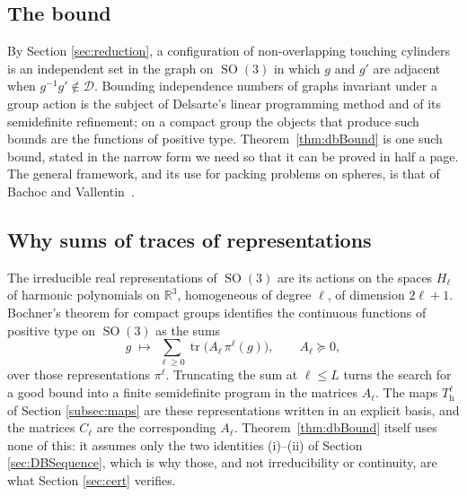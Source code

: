 \documentclass[reqno]{amsart}
\theoremstyle{definition}
\DeclareMathOperator{\SO}{SO}
\DeclareMathOperator{\tr}{tr}
\newcommand{\R}{\mathbb{R}}
\newcommand{\Dom}{\mathcal{D}}
\begin{document}
\subsection{The bound}
By Section \ref{sec:reduction}, a configuration of non-overlapping touching cylinders is an independent
set in the graph on $\SO(3)$ in which $g$ and $g'$ are adjacent when $g^{-1}g'\notin\Dom$. Bounding
independence numbers of graphs invariant under a group action is the subject of Delsarte's linear
programming method and of its semidefinite refinement; on a compact group the objects that produce
such bounds are the functions of positive type. Theorem~\ref{thm:dbBound} is one such bound,
stated in the narrow form we need so that it can be proved in half a page. The general framework,
and its use for packing problems on spheres, is that of Bachoc and
Vallentin~\cite{BV}.

\subsection{Why sums of traces of representations}
The irreducible real representations of $\SO(3)$ are its actions on the spaces $H_\ell$ of
harmonic polynomials on $\R^3$, homogeneous of degree $\ell$, of dimension $2\ell+1$. Bochner's
theorem for compact groups identifies the continuous functions of positive type on $\SO(3)$ as the
sums
\[
g\;\longmapsto\;\sum_{\ell\ge0}\tr\bigl(A_\ell\,\pi^\ell(g)\bigr),
\qquad A_\ell\succeq0,
\]
over those representations $\pi^\ell$. Truncating the sum at $\ell\le L$ turns the search for a
good bound into a finite semidefinite program in the matrices $A_\ell$. The maps
$T^\ell_{\mathrm h}$ of Section \ref{subsec:maps} are these representations written in an explicit
basis, and the matrices $C_\ell$ are the corresponding $A_\ell$. Theorem~\ref{thm:dbBound} itself
uses none of this: it assumes only the two identities (i)--(ii) of Section \ref{sec:DBSequence}, which is
why those, and not irreducibility or continuity, are what Section \ref{sec:cert} verifies.
\end{document}
